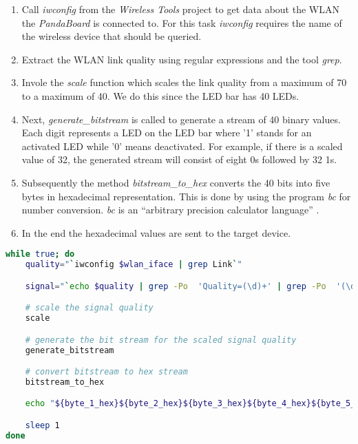 \begin{enumerate} 

\item Call \textit{iwconfig} from the \textit{Wireless Tools} project to get data about the WLAN the \textit{PandaBoard} is connected to. For this task \textit{iwconfig} requires the name of the wireless device that should be queried.

\item Extract the WLAN link quality using regular expressions and the tool \textit{grep}.

\item Invole the \textit{scale} function which scales the link quality from a maximum of 70 to a maximum of 40. We do this since the LED bar has 40 LEDs.

\item Next, \textit{generate\_bitstream} is called to generate a stream of 40 binary values. Each digit represents a LED on the LED bar where '1' stands for an activated LED while '0' means deactivated. For example, if there is a scaled value of 32, the generated stream will consist of eight 0s followed by 32 1s.

\item Subsequently the method \textit{bitstream\_to\_hex} converts the 40 bits into five bytes in hexadecimal representation. This is done by using the program \textit{bc} for number conversion. \textit{bc} is an ``arbitrary precision calculator language'' \cite{BcManPage}.

\item In the end the hexadecimal values are sent to the target device.

\end{enumerate}


\begin{lstlisting}[language=bash, caption=Bash application main loop, label=wlan_info_bash_main_loop]
while true; do
	quality="`iwconfig $wlan_iface | grep Link`"

	signal="`echo $quality | grep -Po  'Quality=(\d)+' | grep -Po  '(\d)+' `"

	# scale the signal quality
	scale

	# generate the bit stream for the scaled signal quality
	generate_bitstream

	# convert bitstream to hex stream
	bitstream_to_hex

	echo "${byte_1_hex}${byte_2_hex}${byte_3_hex}${byte_4_hex}${byte_5_hex}" > $out_device

	sleep 1
done
\end{lstlisting}





